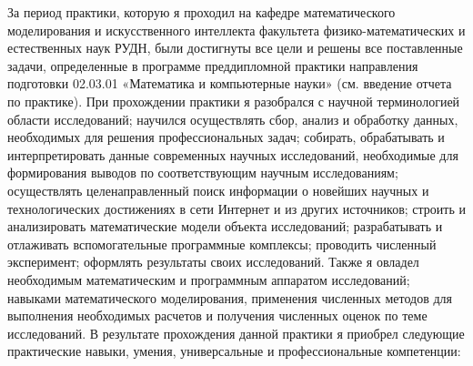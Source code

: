 За период практики, которую я проходил на кафедре математического моделирования и искусственного интеллекта факультета физико-математических и естественных наук РУДН, были достигнуты все цели и решены все поставленные задачи, определенные в программе преддипломной практики направления подготовки 02.03.01 «Математика и компьютерные науки» (см. введение отчета по практике).
При прохождении практики я разобрался с научной терминологией области исследований; научился осуществлять сбор, анализ и обработку данных, необходимых для решения профессиональных задач; собирать, обрабатывать и интерпретировать данные современных научных исследований, необходимые для формирования выводов по соответствующим научным исследованиям; осуществлять целенаправленный поиск информации о новейших научных и технологических достижениях в сети Интернет и из других источников; строить и анализировать математические модели объекта исследований; разрабатывать и отлаживать вспомогательные программные комплексы; проводить численный эксперимент; оформлять результаты своих исследований. Также я овладел необходимым математическим и программным аппаратом исследований; навыками математического моделирования, применения численных методов для выполнения необходимых расчетов и получения численных оценок по теме исследований.
В результате прохождения данной практики я приобрел следующие практические навыки, умения, универсальные и профессиональные компетенции:
